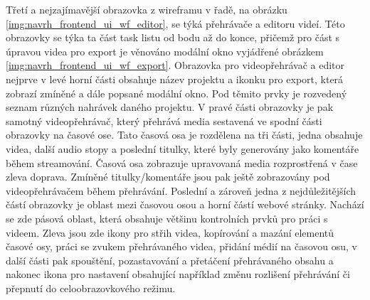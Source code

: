 \documentclass[thesis=M,czech]{FITthesis}[2012/06/26]
\begin{document}
Třetí a nejzajímavější obrazovka z wireframu v řadě, na obrázku \ref{img:navrh_frontend_ui_wf_editor}, se týká přehrávače a editoru videí. Této obrazovky se týka ta část task listu od bodu  až do konce, přičemž pro část s úpravou videa pro export je věnováno modální okno vyjádřené obrázkem \ref{img:navrh_frontend_ui_wf_export}. Obrazovka pro videopřehrávač a editor nejprve v levé horní části obsahuje název projektu a ikonku pro export, která zobrazí zmíněné a dále popsané modální okno. Pod těmito prvky je rozvedený seznam různých nahrávek daného projektu. V pravé části obrazovky je pak samotný videopřehrávač, který přehrává media sestavená ve spodní části obrazovky na časové ose. Tato časová osa je rozdělena na tři části, jedna obsahuje videa, další audio stopy a poslední titulky, které byly generovány jako komentáře během streamování. Časová osa zobrazuje upravovaná media rozprostřená v čase zleva doprava. Zmíněné titulky/komentáře jsou pak ještě zobrazovány pod videopřehrávačem během přehrávání. Poslední a zároveň jedna z nejdůležitějších částí obrazovky je oblast mezi časovou osou a horní částí webové stránky. Nachází se zde pásová oblast, která obsahuje většinu kontrolních prvků pro práci s videem. Zleva jsou zde ikony pro střih videa, kopírování a mazání elementů časové osy, práci se zvukem přehrávaného videa, přidání médií na časovou osu, v další části pak spouštění, pozastavování a přetáčení přehrávaného obsahu a nakonec ikona pro nastavení obsahující například změnu rozlišení přehrávání či přepnutí do celoobrazovkového režimu.
\end{document}
